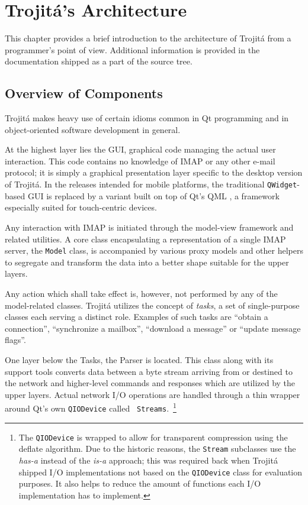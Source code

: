 \documentclass[trojita]{subfiles}
\begin{document}
\chapter{Trojitá's Architecture}

This chapter provides a brief introduction to the architecture of Trojitá from a programmer's point of view.  Additional
information is provided in the documentation shipped as a part of the source tree.

\section{Overview of Components}

Trojitá makes heavy use of certain idioms common in Qt programming and in object-oriented software development in
general.

At the highest layer lies the GUI, graphical code managing the actual user interaction.  This code contains no knowledge
of IMAP or any other e-mail protocol; it is simply a graphical presentation layer specific to the desktop version of
Trojitá.  In the releases intended for mobile platforms, the traditional {\tt QWidget}-based GUI is replaced by a
variant built on top of Qt's QML \cite{qml}, a framework especially suited for touch-centric devices.

Any interaction with IMAP is initiated through the model-view framework \cite{qt-mvc} and related utilities.  A core
class encapsulating a representation of a single IMAP server, the {\tt Model} class, is accompanied by various proxy
models and other helpers to segregate and transform the data into a better shape suitable for the upper layers.

Any action which shall take effect is, however, not performed by any of the model-related classes.  Trojitá utilizes the
concept of {\em tasks}, a set of single-purpose classes each serving a distinct role.  Examples of such tasks are
``obtain a connection'', ``synchronize a mailbox'', ``download a message'' or ``update message flags''.

One layer below the Tasks, the Parser is located.  This class along with its support tools converts data between a byte
stream arriving from or destined to the network and higher-level commands and responses which are utilized by the upper
layers.  Actual network I/O operations are handled through a thin wrapper around Qt's own {\tt QIODevice} called {\tt
Streams}.~\footnote{The {\tt QIODevice} is wrapped to allow for transparent compression using the deflate algorithm.
Due to the historic reasons, the {\tt Stream} subclasses use the {\em has-a} instead of the {\em is-a} approach; this
was required back when Trojitá shipped I/O implementations not based on the {\tt QIODevice} class for evaluation
purposes.  It also helps to reduce the amount of functions each I/O implementation has to implement.}
\end{document}
